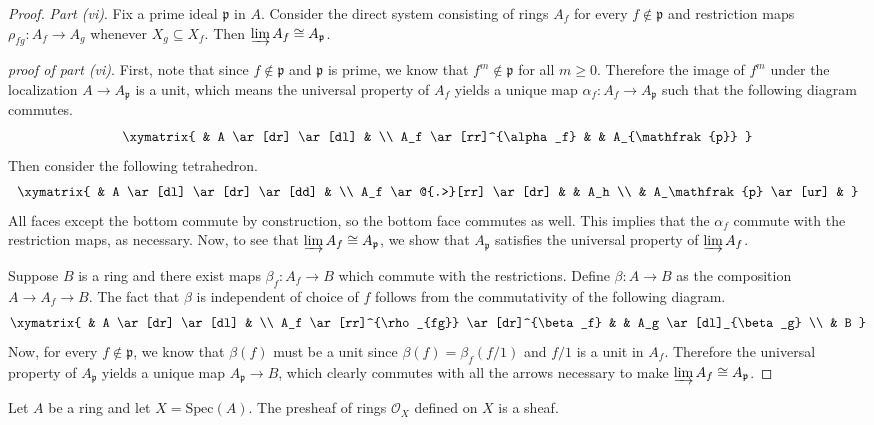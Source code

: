 \begin{definition}
\begin{proof}
\emph{Part (vi)}.
Fix a prime ideal $ \mathfrak{p}$ in $ A$. Consider the direct system consisting of rings $ A_f$ for every $ f \notin \mathfrak{p}$ and restriction maps $ \rho_{fg} : A_f \to A_g$ whenever $ X_g \subseteq X_f$. Then $ \varinjlim A_f \cong A_{\mathfrak{p}}$.

\emph{proof of part (vi)}.
First, note that since $ f \notin \mathfrak{p}$ and $ \mathfrak{p}$ is prime, we know that $ f^m \notin \mathfrak{p}$ for all $ m \geq 0$. Therefore the image of $ f^m$ under the localization $ A \to A_\mathfrak{p}$ is a unit, which means the universal property of $ A_f$ yields a unique map $ \alpha_f : A_f \to A_\mathfrak{p}$ such that the following diagram commutes.
\[ \xymatrix{
& A \ar[dr] \ar[dl] & \\
A_f \ar[rr]^{\alpha_f} & & A_{\mathfrak{p}}
} \]
Then consider the following tetrahedron.
\[ \xymatrix{
& A \ar[dl] \ar[dr] \ar[dd] & \\
A_f \ar@{.>}[rr] \ar[dr] & & A_h \\
& A_\mathfrak{p} \ar[ur] &
} \]
All faces except the bottom commute by construction, so the bottom face commutes as well. This implies that the $ \alpha_f$ commute with the restriction maps, as necessary. Now, to see that $ \varinjlim A_f \cong A_\mathfrak{p}$, we show that $ A_\mathfrak{p}$ satisfies the universal property of $ \varinjlim A_f$.

Suppose $ B$ is a ring and there exist maps $ \beta_f : A_f \to B$ which commute with the restrictions. Define $ \beta : A \to B$ as the composition $ A \to A_f \to B$. The fact that $ \beta$ is independent of choice of $ f$ follows from the commutativity of the following diagram.
\[ \xymatrix{
& A \ar[dr] \ar[dl] & \\
A_f \ar[rr]^{\rho_{fg}} \ar[dr]^{\beta_f} & & A_g \ar[dl]_{\beta_g} \\
& B
} \]
Now, for every $ f \notin \mathfrak{p}$, we know that $ \beta(f)$ must be a unit since $ \beta(f) = \beta_f(f/1)$ and $ f/1$ is a unit in $ A_f$. Therefore the universal property of $ A_\mathfrak{p}$ yields a unique map $ A_{\mathfrak{p}} \to B$, which clearly commutes with all the arrows necessary to make $ \varinjlim A_f \cong A_\mathfrak{p}$.
\end{proof}


\begin{proposition}
Let $ A$ be a ring and let $ X = \mathrm{Spec}(A)$. The presheaf of rings $ \mathcal{O}_X$ defined on $ X$ is a sheaf.
\end{proposition}


\end{definition}
